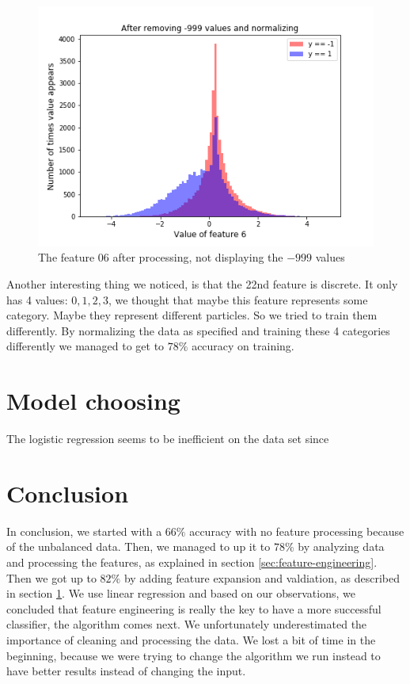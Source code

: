 \documentclass[10pt,conference,compsocconf]{IEEEtran}
\begin{document}
\begin{figure}[h!]
	\centering
  \includegraphics[width=\columnwidth]{graph-features/feature-06-processed.png}
  \caption{The feature 06 after processing, not displaying the $-999$ values}
	\label{fig:feature-06-processed}
\end{figure}

Another interesting thing we noticed, is that the 22nd feature is discrete. It only has 4 values: ${0,1,2,3}$, we thought that maybe this feature represents some category. Maybe they represent different particles. So we tried to train them differently. By normalizing the data as specified and training these 4 categories differently we managed to get to $78\%$ accuracy on training.

\section{Model choosing}
\label{sec:model-choosing}
The logistic regression seems to be inefficient on the data set since 

\section{Conclusion}
In conclusion, we started with a $66\%$ accuracy with no feature processing because of the unbalanced data. Then, we managed to up it to $78\%$ by analyzing data and processing the features, as explained in section \ref{sec:feature-engineering}. Then we got up to $82\%$ by adding feature expansion and valdiation, as described in section \ref{sec:model-choosing}. We use linear regression and based on our observations, we concluded that feature engineering is really the key to have a more successful classifier, the algorithm comes next. We unfortunately underestimated the importance of cleaning and processing the data. We lost a bit of time in the beginning, because we were trying to change the algorithm we run instead to have better results instead of changing the input.
\end{document}
